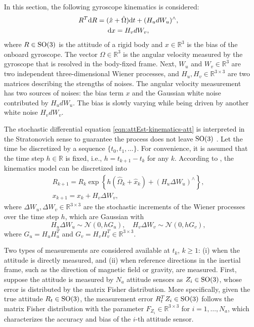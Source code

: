 In this section, the following gyroscope kinematics is considered:
\begin{gather}
	R^T\mathrm{d}{R} = (\hat{x}+\hat{\Omega})\mathrm{d}{t} + (H_udW_u)^\wedge, \label{eqn:attEst-kinematics-att} \\
	\mathrm{d}{x} = H_vdW_v \label{eqn:attEst-kinematics-bias},
\end{gather}
where $R\in\mathrm{SO}(3)$ is the attitude of a rigid body and $x\in\mathbb{R}^3$ is the bias of the onboard gyroscope.
The vector $\Omega\in\mathbb{R}^3$ is the angular velocity measured by the gyroscope that is resolved in the body-fixed frame.
Next, $W_u$ and $W_v\in\mathbb{R}^3$ are two independent three-dimensional Wiener processes, and $H_u, H_v \in \mathbb{R}^{3\times 3}$ are two matrices describing the strengths of noises.
The angular velocity measurement has two sources of noises: the bias term $x$ and the Gaussian white noise contributed by $H_u dW_u$.
The bias is slowly varying while being driven by another white noise $H_v dW_v$.

The stochastic differential equation \eqref{eqn:attEst-kinematics-att} is interpreted in the Stratonovich sense to guarantee the process does not leave $\mathrm{SO}(3)$ \cite{barrau2018stochastic,markley2006attitude}.
Let the time be discretized by a sequence $\{t_0,t_1,\ldots\}$. 
For convenience, it is assumed that the time step $h\in\mathbb{R}$ is fixed, i.e., $h= t_{k+1} - t_k$ for any $k$. 
According to \cite[Eqn. 14]{barrau2018stochastic}, the kinematics model can be discretized into
\begin{gather}
	R_{k+1} = R_k \exp\left\{ h (\hat{\Omega}_k+\hat{x}_k) + (H_u\Delta W_u)^\wedge \right\}, \label{eqn:attEst-kinematics-att-dist} \\
	x_{k+1} = x_k + H_v\Delta W_v,  \label{eqn:attEst-kinematics-bias-dist}
\end{gather}
where $\Delta W_u, \Delta W_v\in\mathbb{R}^{3\times 3}$ are the stochastic increments of the Wiener processes over the time step $h$, which are Gaussian with
\begin{equation}\label{eqn:attEst-kinematics-DeltaW}
	H_u\Delta W_u \sim \mathcal{N}(0,hG_u), \quad H_v\Delta W_v \sim \mathcal{N}(0,hG_v),
\end{equation}
where $G_u = H_uH_u^T$ and $G_v = H_vH_v^T\in\mathbb{R}^{3\times 3}$.

Two types of measurements are considered available at $t_k$, $k\geq 1$: (i) when the attitude is directly measured, and (ii) when reference directions in the inertial frame, such as the direction of magnetic field or gravity, are measured.
First, suppose the attitude is measured by $N_a$ attitude sensors as $Z_i\in\mathrm{SO}(3)$, whose error is distributed by the matrix Fisher distribution.
More specifically, given the true attitude $R_t\in\mathrm{SO}(3)$, the measurement error $R_t^TZ_i\in\mathrm{SO}(3)$ follows the matrix Fisher distribution with the parameter $F_{Z_i}\in\mathbb{R}^{3\times 3}$ for $i=1,\ldots, N_a$, which characterizes the accuracy and bias of the $i$-th attitude sensor. 

